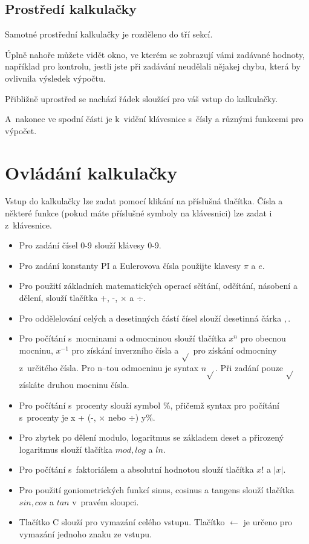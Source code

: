 \documentclass[11pt,a4paper,titlepage]{article}
\begin{document}
	\subsection{Prostředí kalkulačky}

	Samotné prostřední kalkulačky je rozděleno do tří sekcí.

	Úplně nahoře můžete vidět okno, ve kterém se zobrazují vámi zadávané hodnoty, například pro kontrolu, jestli jste při zadávání neudělali nějakej chybu, která by ovlivnila výsledek výpočtu.

	Přibližně uprostřed se nachází řádek sloužící pro váš vstup do kalkulačky.

	A~nakonec ve spodní části je k~vidění klávesnice s~čísly a různými funkcemi pro výpočet.

	\section{Ovládání kalkulačky}

	Vstup do kalkulačky lze zadat pomocí klikání na příslušná tlačítka. Čísla a některé funkce (pokud máte příslušné symboly na klávesnici) lze zadat i z~klávesnice.

	\begin{itemize}
		\item Pro zadání čísel 0-9 slouží klávesy 0-9.
		\item Pro zadání konstanty PI a Eulerovova čísla použijte klavesy $\pi$ a $e$.
		\item Pro použití základních matematických operací sčítání, odčítání, násobení a dělení, slouží tlačítka +, -, $\times$ a $\div$.
		\item Pro oddělelování celých a desetinných částí čísel slouží desetinná čárka $,$.
		\item Pro počítání s~mocninami a odmocninou slouží tlačítka $x^n$ pro obecnou mocninu, $x^{-1}$ pro získání inverzního čísla a $\sqrt{}$ pro získání odmocniny z~určitého čísla. Pro n--tou odmocninu je syntax $n\sqrt{}$. Při zadání pouze $\sqrt{}$ získáte druhou mocninu čísla.
		\item Pro počítání s~procenty slouží symbol \%, přičemž syntax pro počítání s~procenty je x +  (-, $\times$ nebo $\div$) y\%.
		\item Pro zbytek po dělení modulo, logaritmus se základem deset a přirozený logaritmus slouží tlačítka $mod, log$ a $ln$.
		\item Pro počítání s~faktoriálem a absolutní hodnotou slouží tlačítka $x!$ a $|x|$.
		\item Pro použití goniometrických funkcí sinus, cosinus a tangens slouží tlačítka $sin, cos$ a $tan$ v~pravém sloupci.
		\item Tlačítko C slouží pro vymazání celého vstupu. Tlačítko $\leftarrow$ je určeno pro vymazání jednoho znaku ze vstupu.
	\end{itemize}
\end{document}
